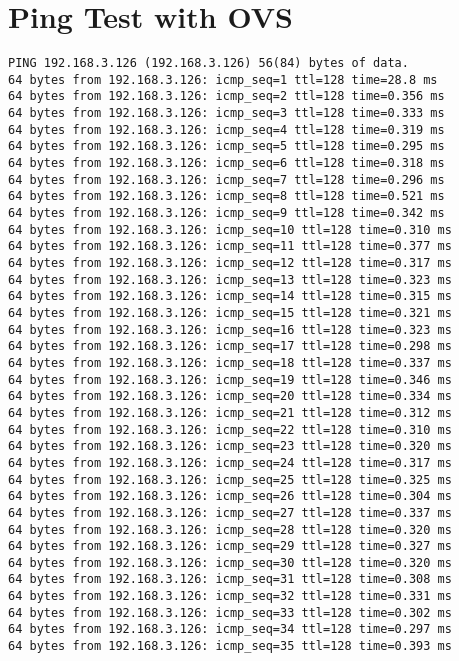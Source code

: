 \section{Ping Test with OVS}\label{app:sec:Ping_test_with_ovs}
\begin{lstlisting}[frame=single, caption={The Ping test with OVS}, label={lst:Pingtest_with_OVS}]
PING 192.168.3.126 (192.168.3.126) 56(84) bytes of data.
64 bytes from 192.168.3.126: icmp_seq=1 ttl=128 time=28.8 ms
64 bytes from 192.168.3.126: icmp_seq=2 ttl=128 time=0.356 ms
64 bytes from 192.168.3.126: icmp_seq=3 ttl=128 time=0.333 ms
64 bytes from 192.168.3.126: icmp_seq=4 ttl=128 time=0.319 ms
64 bytes from 192.168.3.126: icmp_seq=5 ttl=128 time=0.295 ms
64 bytes from 192.168.3.126: icmp_seq=6 ttl=128 time=0.318 ms
64 bytes from 192.168.3.126: icmp_seq=7 ttl=128 time=0.296 ms
64 bytes from 192.168.3.126: icmp_seq=8 ttl=128 time=0.521 ms
64 bytes from 192.168.3.126: icmp_seq=9 ttl=128 time=0.342 ms
64 bytes from 192.168.3.126: icmp_seq=10 ttl=128 time=0.310 ms
64 bytes from 192.168.3.126: icmp_seq=11 ttl=128 time=0.377 ms
64 bytes from 192.168.3.126: icmp_seq=12 ttl=128 time=0.317 ms
64 bytes from 192.168.3.126: icmp_seq=13 ttl=128 time=0.323 ms
64 bytes from 192.168.3.126: icmp_seq=14 ttl=128 time=0.315 ms
64 bytes from 192.168.3.126: icmp_seq=15 ttl=128 time=0.321 ms
64 bytes from 192.168.3.126: icmp_seq=16 ttl=128 time=0.323 ms
64 bytes from 192.168.3.126: icmp_seq=17 ttl=128 time=0.298 ms
64 bytes from 192.168.3.126: icmp_seq=18 ttl=128 time=0.337 ms
64 bytes from 192.168.3.126: icmp_seq=19 ttl=128 time=0.346 ms
64 bytes from 192.168.3.126: icmp_seq=20 ttl=128 time=0.334 ms
64 bytes from 192.168.3.126: icmp_seq=21 ttl=128 time=0.312 ms
64 bytes from 192.168.3.126: icmp_seq=22 ttl=128 time=0.310 ms
64 bytes from 192.168.3.126: icmp_seq=23 ttl=128 time=0.320 ms
64 bytes from 192.168.3.126: icmp_seq=24 ttl=128 time=0.317 ms
64 bytes from 192.168.3.126: icmp_seq=25 ttl=128 time=0.325 ms
64 bytes from 192.168.3.126: icmp_seq=26 ttl=128 time=0.304 ms
64 bytes from 192.168.3.126: icmp_seq=27 ttl=128 time=0.337 ms
64 bytes from 192.168.3.126: icmp_seq=28 ttl=128 time=0.320 ms
64 bytes from 192.168.3.126: icmp_seq=29 ttl=128 time=0.327 ms
64 bytes from 192.168.3.126: icmp_seq=30 ttl=128 time=0.320 ms
64 bytes from 192.168.3.126: icmp_seq=31 ttl=128 time=0.308 ms
64 bytes from 192.168.3.126: icmp_seq=32 ttl=128 time=0.331 ms
64 bytes from 192.168.3.126: icmp_seq=33 ttl=128 time=0.302 ms
64 bytes from 192.168.3.126: icmp_seq=34 ttl=128 time=0.297 ms
64 bytes from 192.168.3.126: icmp_seq=35 ttl=128 time=0.393 ms

\end{lstlisting}
